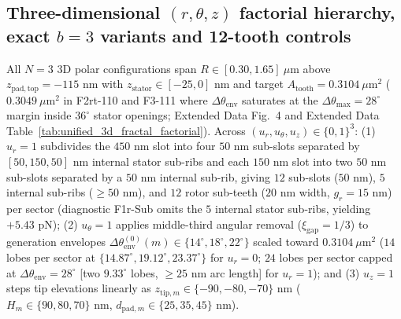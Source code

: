 \documentclass[11pt, a4paper]{article}
\begin{document}
\subsection*{Three-dimensional $(r,\theta,z)$ factorial hierarchy, exact $b=3$ variants and 12-tooth controls}
All $N=3$ 3D polar configurations span $R \in [0.30, 1.65]\ \mu\text{m}$ above $z_{\mathrm{pad,top}} = -115\text{ nm}$ with $z_{\mathrm{stator}} \in [-25, 0]\text{ nm}$ and target $A_{\mathrm{tooth}} = 0.3104\ \mu\text{m}^2$ ($0.3049\ \mu\text{m}^2$ in F2rt-110 and F3-111 where $\Delta\theta_{\mathrm{env}}$ saturates at the $\Delta\theta_{\max} = 28^\circ$ margin inside $36^\circ$ stator openings; Extended Data Fig.~4 and Extended Data Table~\ref{tab:unified_3d_fractal_factorial}). Across $(u_r, u_\theta, u_z) \in \{0,1\}^3$: (1) $u_r=1$ subdivides the $450\text{ nm}$ slot into four $50\text{ nm}$ sub-slots separated by $[50, 150, 50]\text{ nm}$ internal stator sub-ribs and each $150\text{ nm}$ slot into two $50\text{ nm}$ sub-slots separated by a $50\text{ nm}$ internal sub-rib, giving $12$ sub-slots ($50\text{ nm}$), $5$ internal sub-ribs ($\ge 50\text{ nm}$), and $12$ rotor sub-teeth ($20\text{ nm}$ width, $g_r = 15\text{ nm}$) per sector (diagnostic F1r-Sub omits the $5$ internal stator sub-ribs, yielding $+5.43\text{ pN}$); (2) $u_\theta=1$ applies middle-third angular removal ($\xi_{\mathrm{gap}}=1/3$) to generation envelopes $\Delta\theta_{\mathrm{env}}^{(0)}(m) \in \{14^\circ, 18^\circ, 22^\circ\}$ scaled toward $0.3104\ \mu\text{m}^2$ ($14$ lobes per sector at $\{14.87^\circ, 19.12^\circ, 23.37^\circ\}$ for $u_r=0$; $24$ lobes per sector capped at $\Delta\theta_{\mathrm{env}} = 28^\circ$ [two $9.33^\circ$ lobes, $\ge 25\text{ nm}$ arc length] for $u_r=1$); and (3) $u_z=1$ steps tip elevations linearly as $z_{\mathrm{tip},m} \in \{-90, -80, -70\}\text{ nm}$ ($H_m \in \{90, 80, 70\}\text{ nm}$, $d_{\mathrm{pad},m} \in \{25, 35, 45\}\text{ nm}$).
\end{document}
